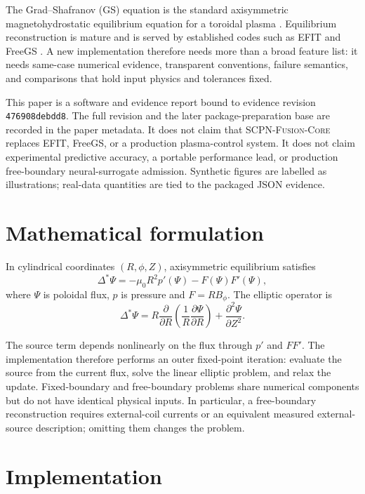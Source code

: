 \documentclass[11pt]{article}
\newcommand{\dstar}{\ensuremath{\Delta^*}}
\newcommand{\code}[1]{\texttt{#1}}
\newcommand{\scpn}{\textsc{SCPN-Fusion-Core}}
\begin{document}
The Grad--Shafranov (GS) equation is the standard axisymmetric
magnetohydrostatic equilibrium equation for a toroidal plasma
\citep{Grad1958,Shafranov1966}.  Equilibrium reconstruction is mature and is
served by established codes such as EFIT \citep{Lao1985,Lao1990} and FreeGS
\citep{FREEGS2019}.  A new implementation therefore needs more than a broad
feature list: it needs same-case numerical evidence, transparent conventions,
failure semantics, and comparisons that hold input physics and tolerances fixed.

This paper is a software and evidence report bound to evidence revision
\code{476908debdd8}.  The full revision and the later package-preparation base
are recorded in the paper metadata.  It does not claim that
\scpn{} replaces EFIT, FreeGS, or a production plasma-control system.  It does
not claim experimental predictive accuracy, a portable performance lead, or
production free-boundary neural-surrogate admission.  Synthetic figures are labelled as illustrations;
real-data quantities are tied to the packaged JSON evidence.

\section{Mathematical formulation}

In cylindrical coordinates $(R,\phi,Z)$, axisymmetric equilibrium satisfies
\begin{equation}
  \dstar\Psi = -\mu_0 R^2 p'(\Psi) - F(\Psi)F'(\Psi),
  \label{eq:gs}
\end{equation}
where $\Psi$ is poloidal flux, $p$ is pressure and $F=RB_\phi$.  The elliptic
operator is
\begin{equation}
  \dstar\Psi = R\frac{\partial}{\partial R}
  \left(\frac{1}{R}\frac{\partial\Psi}{\partial R}\right)
  + \frac{\partial^2\Psi}{\partial Z^2}.
\end{equation}

The source term depends nonlinearly on the flux through $p'$ and $FF'$.  The
implementation therefore performs an outer fixed-point iteration: evaluate the
source from the current flux, solve the linear elliptic problem, and relax the
update.  Fixed-boundary and free-boundary problems share numerical components
but do not have identical physical inputs.  In particular, a free-boundary
reconstruction requires external-coil currents or an equivalent measured
external-source description; omitting them changes the problem.

\section{Implementation}
\end{document}
